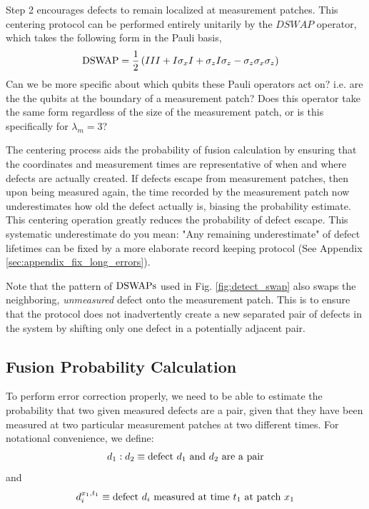 \documentclass[twocolumn,superscriptaddress,aps,prb,floatfix]{revtex4-1}
\newcommand{\figref}[1]{Fig. \ref{#1}}
\newcommand{\MS}[1]{{\color{mauve} {#1}}}
\begin{document}
Step 2 encourages defects to remain localized at measurement patches.  This centering protocol can be performed entirely unitarily by the $DSWAP$ operator, which takes the following form in the Pauli basis,
\begin{align}
\rm{DSWAP} &= \frac{1}{2} \left(III + I\sigma_x I + \sigma_z I \sigma_z - \sigma_z \sigma_x \sigma_z \right)
\end{align}
\MS{Can we be more specific about which qubits these Pauli operators act on? i.e. are the the qubits at the boundary of a measurement patch? Does this operator take the same form regardless of the size of the measurement patch, or is this specifically for $\lambda_m=3$?}

The centering process aids the probability of fusion calculation by ensuring that the coordinates and measurement times are representative of when and where defects are actually created.  If defects escape from measurement patches, then upon being measured again, the time recorded by the measurement patch now underestimates how old the defect actually is, biasing the probability estimate.  This centering operation greatly reduces the probability of defect escape.  This systematic underestimate \MS{do you mean: "Any remaining underestimate"} of defect lifetimes can be fixed by a more elaborate record keeping protocol (See Appendix \ref{sec:appendix_fix_long_errors}).

 Note that the pattern of $\rm{DSWAP}s$ used in \figref{fig:detect_swap} also swaps the neighboring, \emph{unmeasured} defect onto the measurement patch.  This is to ensure that the protocol does not inadvertently create a new separated pair of defects in the system by shifting only one defect in a potentially adjacent pair. 
 
\subsection{Fusion Probability Calculation}
\label{sec:bayes_prob_calc}


To perform error correction properly, we need to be able to estimate the probability that two given measured defects are a pair, given that they have been measured at two particular measurement patches at two different times.  For notational convenience, we define:
\begin{align}
d_1 : d_2 \equiv {\rm defect}\ d_1\ {\rm and}\ d_2\ {\rm are\ a\ pair}
\end{align}
and
\begin{align}
d_i^{x_1,t_1} \equiv {\rm defect}\ d_i\ {\rm measured\ at\ time}\ t_1\ {\rm at\ patch}\ x_1
\end{align}
\end{document}
